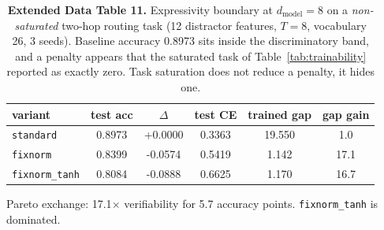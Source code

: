 \documentclass[sn-nature,pdflatex]{sn-jnl}
\begin{document}
\begin{table}[t]
\centering
\caption*{\textbf{Extended Data Table 11.} Expressivity boundary at $d_{\text{model}}=8$ on a \emph{non-saturated} two-hop routing task (12 distractor features, $T=8$, vocabulary 26, 3 seeds). Baseline accuracy \num{0.8973} sits inside the discriminatory band, and a penalty appears that the saturated task of Table~\ref{tab:trainability} reported as exactly zero. Task saturation does not reduce a penalty, it hides one.}
\label{edtab:expressivity}
\begin{tabular}{l S[table-format=1.4] S[table-format=+1.4] S[table-format=1.4] S[table-format=2.3] S[table-format=2.1]}
\toprule
variant & {test acc} & {$\Delta$} & {test CE} & {trained gap} & {gap gain} \\
\midrule
\texttt{standard} & 0.8973 & +0.0000 & 0.3363 & 19.550 & 1.0 \\
\texttt{fixnorm} & 0.8399 & -0.0574 & 0.5419 & 1.142 & 17.1 \\
\texttt{fixnorm\_tanh} & 0.8084 & -0.0888 & 0.6625 & 1.170 & 16.7 \\
\bottomrule
\end{tabular}
\par\vspace{2pt}\noindent\footnotesize Pareto exchange: \num{17.1}$\times$ verifiability for \num{5.7} accuracy points. \texttt{fixnorm\_tanh} is dominated.
\end{table}
\end{document}
